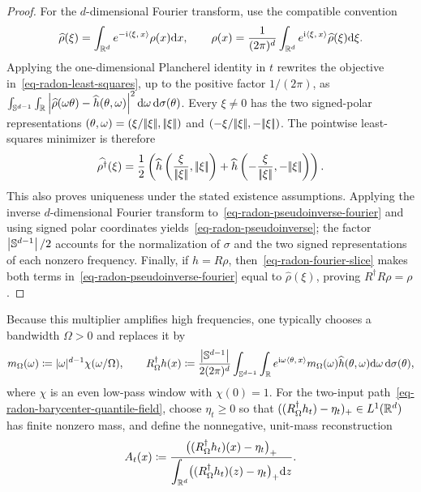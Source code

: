 \begin{proof}
For the $d$-dimensional Fourier transform, use the compatible convention
\[
\widehat\rho(\xi)
=
\int_{\mathbb{R}^d}e^{-\mathrm{i}\langle \xi,\,x\rangle}\rho(x)\mathrm{d} x,
\qquad
\rho(x)
=
\frac{1}{(2\pi)^d}\int_{\mathbb{R}^d}e^{\mathrm{i}\langle \xi,\,x\rangle}\widehat\rho(\xi)\mathrm{d}\xi.
\]
Applying the one-dimensional Plancherel identity in $t$ rewrites the objective in~\eqref{eq-radon-least-squares}, up to the positive factor $1/(2\pi)$, as
$\int_{\mathbb{S}^{d-1}}\int_{\mathbb{R}} \left\lvert\widehat\rho(\omega\theta)-\widehat h(\theta,\omega)\right\rvert^2 \mathrm{d}\omega\,\mathrm{d}\sigma(\theta)$.
Every $\xi\neq0$ has the two signed-polar representations
$(\theta,\omega)=(\xi/|\!| \xi |\!|,|\!| \xi |\!|)$ and
$(-\xi/|\!| \xi |\!|,-|\!| \xi |\!|)$. The pointwise least-squares minimizer is therefore
\begin{equation}\label{eq-radon-pseudoinverse-fourier}
\widehat{\rho^\dagger}(\xi)=\frac12\left(\widehat h\left(\frac{\xi}{\norm{\xi}},\norm{\xi}\right)+\widehat h\left(-\frac{\xi}{\norm{\xi}},-\norm{\xi}\right)\right).
\end{equation}
This also proves uniqueness under the stated existence assumptions. Applying the inverse $d$-dimensional Fourier transform to~\eqref{eq-radon-pseudoinverse-fourier} and using signed polar coordinates yields~\eqref{eq-radon-pseudoinverse}; the factor $\left\lvert\mathbb{S}^{d-1}\right\rvert/2$ accounts for the normalization of $\sigma$ and the two signed representations of each nonzero frequency. Finally, if $h=R\rho$, then~\eqref{eq-radon-fourier-slice} makes both terms in~\eqref{eq-radon-pseudoinverse-fourier} equal to $\widehat\rho(\xi)$, proving $R^\dagger R\rho=\rho$.
\end{proof}
Because this multiplier amplifies high frequencies, one typically chooses a bandwidth $\Omega>0$ and replaces it by
\begin{equation}\label{eq-radon-windowed-ramp}
m_\Omega(\omega)
\coloneqq
|\omega|^{d-1}\chi(\omega/\Omega),
\qquad
R_\Omega^\dagger h(x)
\coloneqq
\frac{\left\lvert\mathbb{S}^{d-1}\right\rvert}{2(2\pi)^d}
\int_{\mathbb{S}^{d-1}}\int_{\mathbb{R}}
e^{\mathrm{i}\omega\langle \theta,\,x\rangle}
m_\Omega(\omega)\widehat h(\theta,\omega)
\mathrm{d}\omega\,\mathrm{d}\sigma(\theta),
\end{equation}
where $\chi$ is an even low-pass window with $\chi(0)=1$. For the two-input path~\eqref{eq-radon-barycenter-quantile-field}, choose $\eta_t\geq0$ so that $((R_\Omega^\dagger h_t)-\eta_t)_+\in L^1(\mathbb{R}^d)$ has finite nonzero mass, and define the nonnegative, unit-mass reconstruction
\begin{equation}\label{eq-radon-display-reconstruction}
A_t(x)
\coloneqq
\frac{\bigl((R_\Omega^\dagger h_t)(x)-\eta_t\bigr)_+}
{\displaystyle\int_{\mathbb{R}^d}\bigl((R_\Omega^\dagger h_t)(z)-\eta_t\bigr)_+\mathrm{d} z}.
\end{equation}
